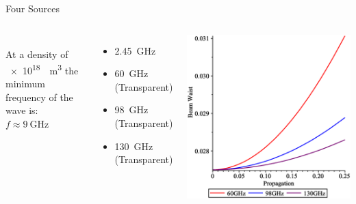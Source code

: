 \documentclass[hyperref={colorlinks=true,urlcolor=blue,linkcolor=.},aspectratio=1610,mathserif]{beamer}
\begin{document}
\begin{frame}{Four Sources}
	\begin{columns}
		\\
		At a density of \SI{e18}{\per\meter\cubed} the minimum frequency of the wave is:
		\(f \approx \SI{9}{\giga\hertz}\)\newline
		\begin{itemize}
			\item \SI{2.45}{\giga\hertz}
			\item \SI{60}{\giga\hertz} (Transparent)
			\item \SI{98}{\giga\hertz} (Transparent)
			\item \SI{130}{\giga\hertz} (Transparent)
		\end{itemize}
		\includegraphics[width=\textwidth]{Figures/BeamProp.eps}
	\end{columns}
\end{frame}
\end{document}
